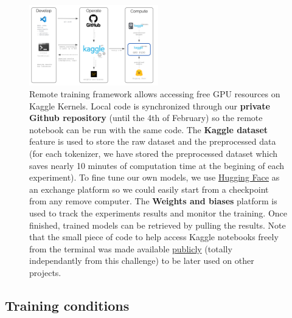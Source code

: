 \begin{figure}
    \centering
    \includegraphics[width=0.5\textwidth]{figures/training_framework.png}
    \caption{Remote training framework allows accessing free GPU resources on Kaggle Kernels. Local code is synchronized through our \textbf{private Github repository} (until the 4th of February) so the remote notebook can be run with the same code. The \textbf{Kaggle dataset} feature is used to store the raw dataset and the preprocessed data (for each tokenizer, we have stored the preprocessed dataset which saves nearly 10 minutes of computation time at the begining of each experiment). To fine tune our own models, we use \href{https://huggingface.co/balthou}{Hugging Face} as an exchange platform so we could easily start from a checkpoint from any remove computer. The \textbf{Weights and biases} platform is used to track the experiments results and monitor the training. Once finished, trained models can be retrieved by pulling the results.
    Note that the small piece of code to help access Kaggle notebooks freely from the terminal was made available \href{https://github.com/balthazarneveu/mva\_pepites}{publicly} (totally independantly from this challenge) to be later used on other projects.
    }
    \label{fig:training_framework_schema}
\end{figure}

\subsection*{Training conditions}
\label{sec:training conditions}

